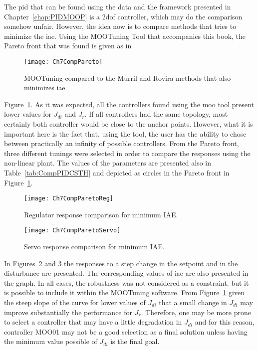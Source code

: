 The \gls{pid} that can be found using the data and the framework presented in Chapter~\ref{chap:PIDMOOP} is a \gls{2dof} controller, which may do the comparison somehow unfair. However, the idea now is to compare methods that tries to minimize the \gls{iae}. Using the MOOTuning Tool that accompanies this book, the Pareto front that was found is given as in %
%
\begin{figure}[tb]
	\centering
	\texttt{[image: Ch7CompPareto]}
	\caption{MOOTuning compared to the Murril and Rovira methods that also minimizes \gls{iae}.}
	\label{fig:Ch7CompPareto}
\end{figure}
%
Figure~\ref{fig:Ch7CompPareto}. As it was expected, all the controllers found using the \gls{moo} tool present lower values for $J_{di}$ and $J_r$. If all controllers had the same topology, most certainly both controller would be close to the anchor points. However, what it is important here is the fact that, using the tool, the user has the ability to chose between practically an infinity of possible controllers. From the Pareto front, three different tunings were selected in order to compare the responses using the non-linear plant. The values of the parameters are presented also in Table~\ref{tab:CompPIDCSTH} and depicted as circles in the Pareto front in Figure~\ref{fig:Ch7CompPareto}.
%
\begin{figure}[tb]
	\centering
	\texttt{[image: Ch7CompParetoReg]}
	\caption{Regulator response comparison for minimum IAE.}
	\label{fig:Ch7CompParetoReg}
\end{figure}
%
\begin{figure}[tb]
	\centering
	\texttt{[image: Ch7CompParetoServo]}
	\caption{Servo response comparison for minimum IAE.}
	\label{fig:Ch7CompParetoServo}
\end{figure}

In Figures~\ref{fig:Ch7CompParetoReg} and \ref{fig:Ch7CompParetoServo} the responses to a step change in the setpoint and in the disturbance are presented. The corresponding values of \gls{iae} are also presented in the graph. In all cases, the robustness was not considered as a constraint. but it is possible to include it within the MOOTuning software. From Figure~\ref{fig:Ch7CompPareto} given the steep slope of the curve for lower values of $J_{di}$ that a small change in $J_{di}$ may improve substantially the performance for $J_r$. Therefore, one may be more prone to select a controller that may have a little degradation in $J_{di}$ and for this reason, controller MOO01 may not be a good selection as a final solution unless having the minimum value possible of $J_{di}$ is the final goal.

